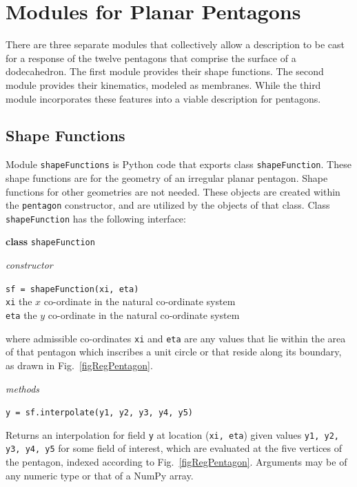 \section{Modules for Planar Pentagons}
\label{appPentagons}

There are three separate modules that collectively allow a description to be cast for a response of the twelve pentagons that comprise the surface of a dodecahedron.  The first module provides their shape functions.  The second module provides their kinematics, modeled as membranes.  While the third module incorporates these features into a viable description for pentagons.

\subsection{Shape Functions}
\label{appShapeFunctions}

Module \texttt{shapeFunctions} is Python code that exports class \texttt{shapeFunction}.  These shape functions are for the geometry of an irregular planar pentagon.  Shape functions for other geometries are not needed.  These objects are created within the \texttt{pentagon} constructor, and are utilized by the objects of that class.  Class \texttt{shapeFunction} has the following interface:

\medskip\noindent
\textbf{class} \texttt{shapeFunction}

\medskip\noindent
\textit{constructor}

\medskip\noindent
\texttt{sf = shapeFunction(xi, eta)} \\
\indent \texttt{xi} \;\;\;\: the $x$ co-ordinate in the natural co-ordinate system \\
\indent \texttt{eta} \;\;  the $y$ co-ordinate in the natural co-ordinate system

\medskip\noindent
where admissible co-ordinates \texttt{xi} and \texttt{eta} are any values that lie within the area of that pentagon which inscribes a unit circle or that reside along its boundary, as drawn in Fig.~\ref{figRegPentagon}.

\medskip\noindent
\textit{methods}

\medskip\noindent
\texttt{y = sf.interpolate(y1, y2, y3, y4, y5)}

\medskip\noindent
Returns an interpolation for field \texttt{y} at location (\texttt{xi, eta}) given values \texttt{y1, y2, y3, y4, y5} for some field of interest, which are evaluated at the five vertices of the pentagon, indexed according to Fig.~\ref{figRegPentagon}.  Arguments may be of any numeric type or that of a NumPy array.

